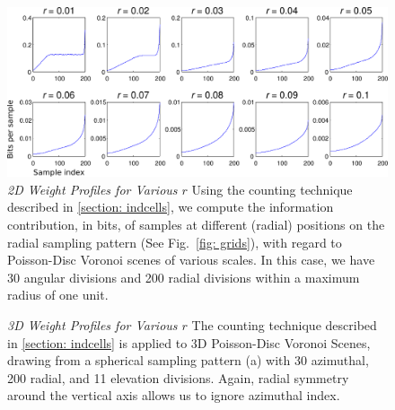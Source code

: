 \begin{figure}
\includegraphics[width=5in]{media/weight_profiles}
\caption{\emph{2D Weight Profiles for Various $r$}
Using the counting technique described in \ref{section: indcells}, 
we compute the information contribution, in bits, 
of samples at different (radial) positions on the radial sampling pattern (See Fig.\ \ref{fig: grids}),
with regard to Poisson-Disc Voronoi scenes of various scales.
In this case, we have 30 angular divisions and 200 radial divisions within a maximum radius of one unit.
}
\end{figure}

\begin{figure}
\centering
{}%
\caption{\emph{3D Weight Profiles for Various $r$}
The counting technique described in \ref{section: indcells} is applied 
to 3D Poisson-Disc Voronoi Scenes, drawing from a spherical sampling pattern (a)
with 30 azimuthal, 200 radial, and 11 elevation divisions.  Again, radial symmetry around the 
vertical axis allows us to ignore azimuthal index.
}
\end{figure}


